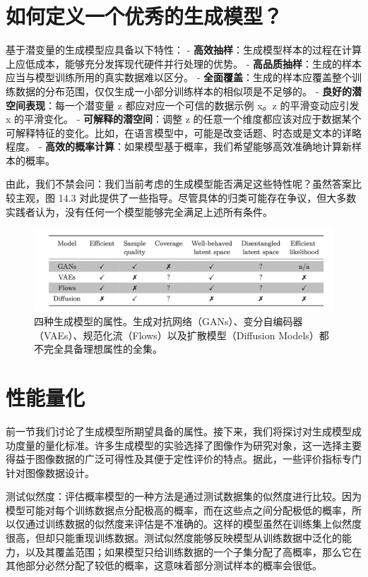 \section{如何定义一个优秀的生成模型？}
基于潜变量的生成模型应具备以下特性：
- \textbf{高效抽样}：生成模型样本的过程在计算上应低成本，能够充分发挥现代硬件并行处理的优势。
- \textbf{高品质抽样}：生成的样本应当与模型训练所用的真实数据难以区分。
- \textbf{全面覆盖}：生成的样本应覆盖整个训练数据的分布范围，仅仅生成一小部分训练样本的相似项是不足够的。
- \textbf{良好的潜空间表现}：每一个潜变量 z 都应对应一个可信的数据示例 x。z 的平滑变动应引发 x 的平滑变化。
- \textbf{可解释的潜空间}：调整 z 的任意一个维度都应该对应于数据某个可解释特征的变化。比如，在语言模型中，可能是改变话题、时态或是文本的详略程度。
- \textbf{高效的概率计算}：如果模型基于概率，我们希望能够高效准确地计算新样本的概率。

由此，我们不禁会问：我们当前考虑的生成模型能否满足这些特性呢？虽然答案比较主观，图 14.3 对此提供了一些指导。尽管具体的归类可能存在争议，但大多数实践者认为，没有任何一个模型能够完全满足上述所有条件。

\begin{figure}[ht!]
    \centering
    \includegraphics[width=0.7\linewidth]{png/chapter14/f143.png}
    \caption{四种生成模型的属性。生成对抗网络（GANs）、变分自编码器（VAEs）、规范化流（Flows）以及扩散模型（Diffusion Models）都不完全具备理想属性的全集。}
    \end{figure}

\section{性能量化}
前一节我们讨论了生成模型所期望具备的属性。接下来，我们将探讨对生成模型成功度量的量化标准。许多生成模型的实验选择了图像作为研究对象，这一选择主要得益于图像数据的广泛可得性及其便于定性评价的特点。据此，一些评价指标专门针对图像数据设计。

测试似然度：评估概率模型的一种方法是通过测试数据集的似然度进行比较。因为模型可能对每个训练数据点分配极高的概率，而在这些点之间分配极低的概率，所以仅通过训练数据的似然度来评估是不准确的。这样的模型虽然在训练集上似然度很高，但却只能重现训练数据。测试似然度能够反映模型从训练数据中泛化的能力，以及其覆盖范围；如果模型只给训练数据的一个子集分配了高概率，那么它在其他部分必然分配了较低的概率，这意味着部分测试样本的概率会很低。

